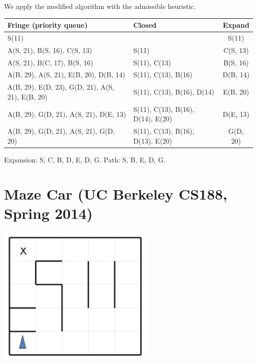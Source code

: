 \documentclass[11pt, a4paper]{article}
\begin{document}
\begin{enumerate}
    \begin{solution}
        We apply the modified algorithm with the admissible heuristic.
    
        \begin{table}[h]
            \centering
            \begin{tabular}{l|l|c}
                \toprule
                Fringe (priority queue) & Closed & Expand \\
                \midrule
                S(11) & & S(11) \\
                A(S, 21), B(S, 16), C(S, 13) & S(11) & C(S, 13) \\
                A(S, 21), B(C, 17), B(S, 16) & S(11), C(13) & B(S, 16) \\
                A(B, 29), A(S, 21), E(B, 20), D(B, 14) & S(11), C(13), B(16) & D(B, 14) \\
                A(B, 29), E(D, 23), G(D, 21), A(S, 21), E(B, 20) & S(11), C(13), B(16), D(14) & E(B, 20) \\
                A(B, 29), G(D, 21), A(S, 21), D(E, 13) & S(11), C(13), B(16), D(14), E(20) & D(E, 13) \\
                A(B, 29), G(D, 21), A(S, 21), G(D, 20) & S(11), C(13), B(16), D(13), E(20) & G(D, 20) \\
                \bottomrule
            \end{tabular}
        \end{table}
        
        Expansion: S, C, B, D, E, D, G. Path: S, B, E, D, G.
    \end{solution}
\end{enumerate}

\newpage

\section{Maze Car (UC Berkeley CS188, Spring 2014)}

\begin{center}
   \includegraphics[width=0.3\linewidth]{figures/e1_maze.png}
\end{center}
\end{document}
